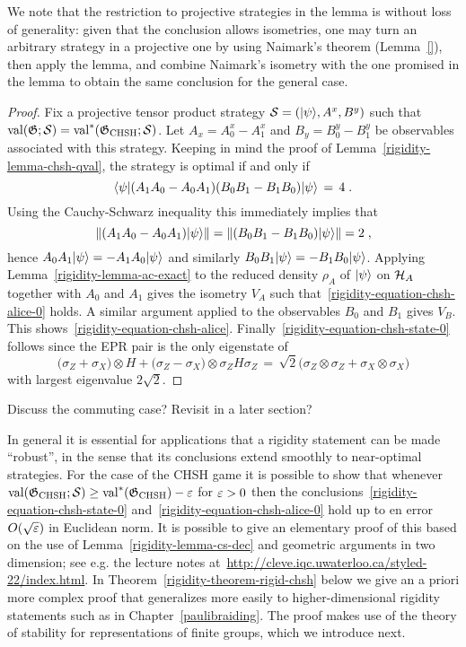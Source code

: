 We note that the restriction to projective strategies in the lemma is without loss of generality: given that the conclusion allows isometries, one may turn an arbitrary strategy in a projective one by using Naimark's theorem (Lemma~\ref{}), then apply the lemma, and combine Naimark's isometry with the one promised in the lemma to obtain the same conclusion for the general case. 


\begin{proof}
Fix a  projective tensor product strategy $\mathcal{S} = (|\psi\rangle,A^x,B^y)$ such that $\mathrm{val}(\mathfrak{G};\mathcal{S})=\mathrm{val}^{*}(\mathfrak{G}_{\mathrm{CHSH}};\mathcal{S})$. Let $A_x = A^x_0-A^x_1$ and $B_y = B^y_0-B^y_1$ be observables associated with this strategy.
Keeping in mind the proof of Lemma~\ref{rigidity-lemma-chsh-qval}, the strategy is optimal if and only if 
\begin{equation}\label{equation-exact-1}
\langle\psi|(A_1A_0-A_0A_1) (B_0B_1-B_1B_0)|\psi\rangle \,=\, 4\;.
\end{equation}
Using the Cauchy-Schwarz inequality this immediately implies that 
\[\|(A_1A_0-A_0A_1) |\psi\rangle\|=\|(B_0B_1-B_1B_0)|\psi\rangle\|=2\;,\]
hence $A_0A_1 |\psi\rangle = - A_1 A_0 |\psi\rangle$ and similarly $B_0B_1 |\psi\rangle = - B_1 B_0 |\psi\rangle$. Applying Lemma~\ref{rigidity-lemma-ac-exact} to the reduced density $\rho_A$ of $|\psi\rangle$ on $\mathcal{H}_A$ together with $A_0$ and $A_1$ gives the isometry $V_A$ such that~\eqref{rigidity-equation-chsh-alice-0} holds. A similar argument applied to the observables $B_0$ and $B_1$ gives $V_B$. This shows~\eqref{rigidity-equation-chsh-alice}. Finally~\eqref{rigidity-equation-chsh-state-0} follows since the EPR pair is the only eigenstate of 
\[ \big(\sigma_Z  + \sigma_X \big) \otimes H + \big(\sigma_Z - \sigma_X\big) \otimes \sigma_Z H \sigma_Z \,=\, \sqrt{2}\big( \sigma_Z \otimes \sigma_Z + \sigma_X \otimes \sigma_X \big)\]
with largest eigenvalue $2\sqrt{2}$. 
\end{proof}

\begin{remark} Discuss the commuting case? Revisit in a later section? 
\end{remark}


In general it is essential for applications that a rigidity statement can be made ``robust'', in the sense that its conclusions extend smoothly to near-optimal strategies. For the case of the CHSH game it is possible to show that whenever $\mathrm{val}(\mathfrak{G}_{\mathrm{CHSH}};\mathcal{S})\geq\mathrm{val}^*(\mathfrak{G}_{\mathrm{CHSH}})-\varepsilon$ for $\varepsilon>0$ then the conclusions~\eqref{rigidity-equation-chsh-state-0} and~\eqref{rigidity-equation-chsh-alice-0} hold up to en error $O(\sqrt{\varepsilon})$ in Euclidean norm. 
It is possible to give an elementary proof of this based on the use of Lemma~\ref{rigidity-lemma-cs-dec} and geometric arguments in two dimension; see e.g. the lecture notes at~\url{http://cleve.iqc.uwaterloo.ca/styled-22/index.html}. In Theorem~\ref{rigidity-theorem-rigid-chsh} below we give an a priori more complex proof that generalizes more easily to higher-dimensional rigidity statements such as in Chapter~\ref{paulibraiding}. The proof makes use of the theory of stability for representations of finite groups, which we introduce next. 




